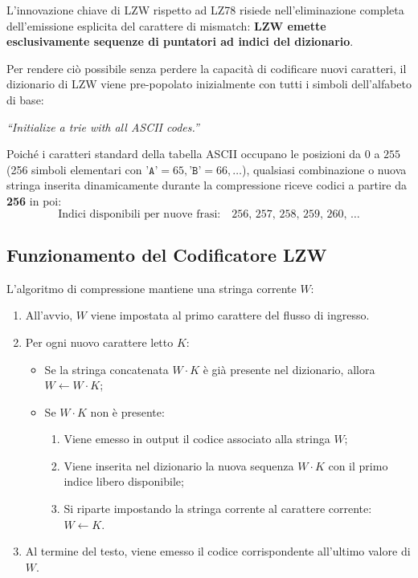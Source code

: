 L'innovazione chiave di LZW rispetto ad LZ78 risiede nell'eliminazione completa dell'emissione esplicita del carattere di mismatch: \textbf{LZW emette esclusivamente sequenze di puntatori ad indici del dizionario}.

Per rendere ci\`o possibile senza perdere la capacit\`a di codificare nuovi caratteri, il dizionario di LZW viene pre-popolato inizialmente con tutti i simboli dell'alfabeto di base:
\begin{center}
  \textit{``Initialize a trie with all ASCII codes.''}
\end{center}
Poich\'e i caratteri standard della tabella ASCII occupano le posizioni da $0$ a $255$ (256 simboli elementari con $\texttt{'A'} = 65, \texttt{'B'} = 66, \dots$), qualsiasi combinazione o nuova stringa inserita dinamicamente durante la compressione riceve codici a partire da \textbf{256} in poi:
\begin{equation}
  \text{Indici disponibili per nuove frasi:} \quad 256, \, 257, \, 258, \, 259, \, 260, \, \dots
\end{equation}

\FloatBarrier
\subsection{Funzionamento del Codificatore LZW}
\label{subsec:lzw-encoding-process}

L'algoritmo di compressione mantiene una stringa corrente $W$:
\begin{enumerate}
  \item All'avvio, $W$ viene impostata al primo carattere del flusso di ingresso.
  \item Per ogni nuovo carattere letto $K$:
  \begin{itemize}
    \item Se la stringa concatenata $W \cdot K$ \`e gi\`a presente nel dizionario, allora $W \leftarrow W \cdot K$;
    \item Se $W \cdot K$ non \`e presente:
    \begin{enumerate}
      \item Viene emesso in output il codice associato alla stringa $W$;
      \item Viene inserita nel dizionario la nuova sequenza $W \cdot K$ con il primo indice libero disponibile;
      \item Si riparte impostando la stringa corrente al carattere corrente: $W \leftarrow K$.
    \end{enumerate}
  \end{itemize}
  \item Al termine del testo, viene emesso il codice corrispondente all'ultimo valore di $W$.
\end{enumerate}


